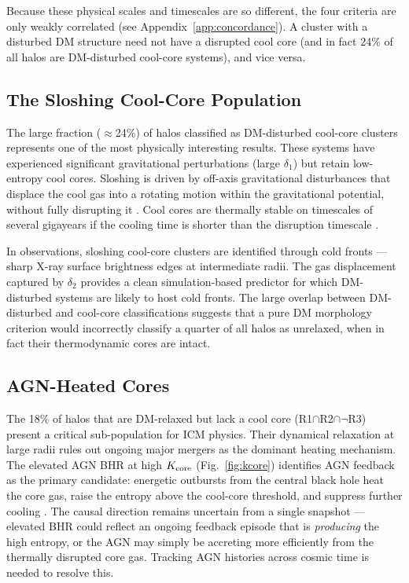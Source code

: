 \documentclass[12pt]{article}
\newcommand{\Kcore}{K_{\rm core}}
\newcommand{\deltai}{\delta_1}
\newcommand{\deltaii}{\delta_2}
\begin{document}
Because these physical scales and timescales are so different, the four criteria are
only weakly correlated (see Appendix~\ref{app:concordance}).
A cluster with a disturbed DM structure need not have a disrupted cool core (and in
fact 24\% of all halos are DM-disturbed cool-core systems), and vice versa.

\subsection{The Sloshing Cool-Core Population}

The large fraction ($\approx$24\%) of halos classified as DM-disturbed cool-core clusters
represents one of the most physically interesting results.  These systems have experienced
significant gravitational perturbations (large $\deltai$) but retain low-entropy cool
cores.  Sloshing is driven by off-axis gravitational disturbances that displace the cool
gas into a rotating motion within the gravitational potential, without fully disrupting it
\citep{markevitch2007,zuhone2010}.  Cool cores are thermally stable on timescales of
several gigayears if the cooling time is shorter than the disruption timescale
\citep{burns2008}.

In observations, sloshing cool-core clusters are identified through cold fronts --- sharp
X-ray surface brightness edges at intermediate radii.  The gas displacement captured
by $\deltaii$ provides a clean simulation-based predictor for which DM-disturbed systems
are likely to host cold fronts.  The large overlap between DM-disturbed and cool-core
classifications suggests that a pure DM morphology criterion would incorrectly classify
a quarter of all halos as unrelaxed, when in fact their thermodynamic cores are intact.

\subsection{AGN-Heated Cores}

The 18\% of halos that are DM-relaxed but lack a cool core (R1$\cap$R2$\cap\lnot$R3)
present a critical sub-population for ICM physics.  Their dynamical relaxation at large
radii rules out ongoing major mergers as the dominant heating mechanism.  The elevated
AGN BHR at high $\Kcore$ (Fig.~\ref{fig:kcore}) identifies AGN feedback as the primary
candidate: energetic outbursts from the central black hole heat the core gas, raise the
entropy above the cool-core threshold, and suppress further cooling \citep{gitti2012}.
The causal direction remains uncertain from a single snapshot --- elevated BHR could
reflect an ongoing feedback episode that is \emph{producing} the high entropy, or the
AGN may simply be accreting more efficiently from the thermally disrupted core gas.
Tracking AGN histories across cosmic time is needed to resolve this.
\end{document}
